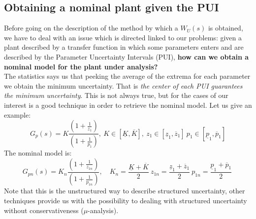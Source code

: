 \documentclass[a4paper, 12pt]{article}
\begin{document}
    \subsection{Obtaining a nominal plant given the PUI}
    Before going on the description of the method by which a $W_U(s)$ is obtained, we have to deal with an issue which is directed linked to our problems: given a plant described by a transfer function in which some parameters enters and are described by the Parameter Uncertainty Intervals (PUI), \textbf{how can we obtain a nominal model for the plant under analysis?} \\
    The statistics says us that peeking the average of the extrema for each parameter we obtain the minimum uncertainty. That is \textit{the center of each PUI guarantees the minimum uncertainty}. This is not always true, but for the cases of our interest is a good technique in order to retrieve the nominal model. Let us give an example:
    \begin{equation}
        G_p(s) = K \frac{(1+\frac{1}{z_1})}{(1+\frac{1}{p_1})}, \ 
        K \in [\underline{K}, \overline{K}], \
        z_1 \in [\underline{z}_1, \overline{z}_1]\
        p_1 \in [\underline{p}_1, \overline{p}_1]
    \end{equation}
    The nominal model is:
    \begin{equation}
        G_{pn}(s) = K_n \frac{(1+\frac{1}{z_{1n}})}{(1+\frac{1}{p_{1n}})}, \quad
        K_n = \frac{\underline{K}+ \overline{K}}{2} \ 
        z_{1n} = \frac{\underline{z}_1+ \overline{z}_1}{2} \ 
        p_{1n} = \frac{\underline{p}_1+\overline{p}_1}{2} \ 
    \end{equation}
    Note that this is the unstructured way to describe structured uncertainty, other techniques provide us with the possibility to dealing with structured uncertainty without conservativeness ($\mu$-analysis).
\end{document}
